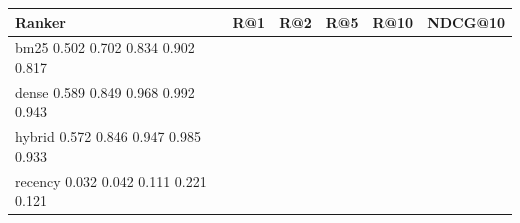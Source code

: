 \begin{tabular}{lccccc}
\toprule
Ranker & R@1 & R@2 & R@5 & R@10 & NDCG@10 \\
\midrule
bm25 0.502 0.702 0.834 0.902 0.817 \\
dense 0.589 0.849 0.968 0.992 0.943 \\
hybrid 0.572 0.846 0.947 0.985 0.933 \\
recency 0.032 0.042 0.111 0.221 0.121 \\
\bottomrule
\end{tabular}